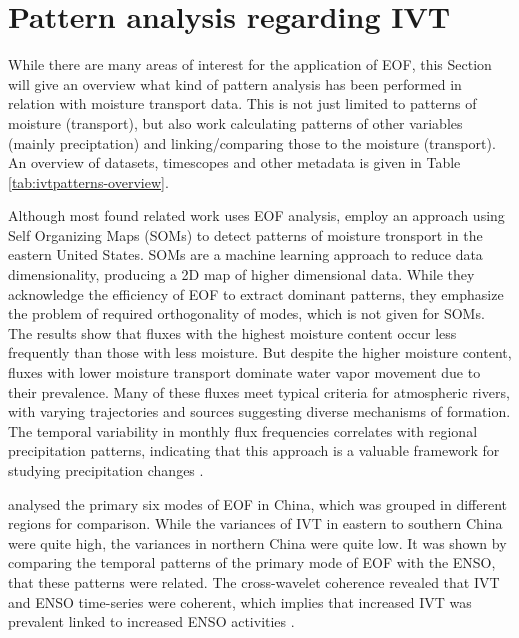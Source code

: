 \section{Pattern analysis regarding IVT}
\label{sec:related_pattern_analysis}





While there are many areas of interest for the application of EOF, this Section will give an overview what kind of pattern analysis has been performed in relation with moisture transport data.
This is not just limited to patterns of moisture (transport), but also work calculating patterns of other variables (mainly preciptation) and linking/comparing those to the moisture (transport). 
An overview of datasets, timescopes and other metadata is given in Table \ref{tab:ivtpatterns-overview}.


Although most found related work uses EOF analysis, \citeauthor{teale_patterns_2020} employ an approach using Self Organizing Maps (SOMs) to detect patterns of moisture tronsport in the eastern United States.
SOMs are a machine learning approach to reduce data dimensionality, producing a 2D map of higher dimensional data. 
While they acknowledge the efficiency of EOF to extract dominant patterns, they emphasize the problem of required orthogonality of modes, which is not given for SOMs. 
The results show that fluxes with the highest moisture content occur less frequently than those with less moisture. 
But despite the higher moisture content, fluxes with lower moisture transport dominate water vapor movement due to their prevalence. 
Many of these fluxes meet typical criteria for atmospheric rivers, with varying trajectories and sources suggesting diverse mechanisms of formation. 
The temporal variability in monthly flux frequencies correlates with regional precipitation patterns, indicating that this approach is a valuable framework for studying precipitation changes \cite{teale_patterns_2020}.



\citeauthor{ayantobo_integrated_2022} analysed the primary six modes of EOF in China, which was grouped in different regions for comparison. 
While the variances of IVT in eastern to southern China were quite high, the variances in northern China were quite low. 
It was shown by comparing the temporal patterns of the primary mode of EOF with the ENSO, that these patterns were related. 
The cross-wavelet coherence revealed that IVT and ENSO time-series were coherent, which implies that increased IVT was prevalent linked to increased ENSO activities \cite{ayantobo_integrated_2022}. 


